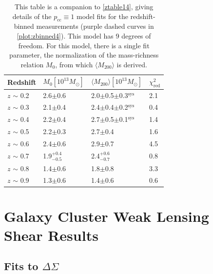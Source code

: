 \begin{landscape}
\begin{table}
\centering
    \caption[Shear Results for Redshift-Binned Clusters (Perfectly Centered Model)]{This table is a companion to \autoref{ztable14}, giving details of the $p_{\mathrm{cc}} \equiv 1$ model fits for the redshift-binned measurements (purple dashed curves in \autoref{plot:zbinned4}). This model has 9 degrees of freedom. For this model, there is a single fit parameter, the normalization of the mass-richness relation $M_0$, from which $\langle M_{200} \rangle$ is derived.}
    \begin{tabular}{llll}
      \hline
      Redshift & $M_0 \left[ 10^{13} M_{\odot}\right]$ & $\langle M_{200} \rangle \left[ 10^{13} M_{\odot}\right]$ & $\chi^2_{\mathrm{red}}$ \\ \hline
      $z$ $\sim$ 0.2 & 2.6$\pm$0.6 & 2.0$\pm$0.5$\pm$0.3$^{\mathrm{sys}}$ & 2.1  \\
      $z$ $\sim$ 0.3 & 2.1$\pm$0.4 & 2.4$\pm$0.4$\pm$0.2$^{\mathrm{sys}}$ & 0.4  \\
      $z$ $\sim$ 0.4 & 2.2$\pm$0.4 & 2.7$\pm$0.5$\pm$0.1$^{\mathrm{sys}}$ & 1.4  \\
      $z$ $\sim$ 0.5 & 2.2$\pm$0.3 & 2.7$\pm$0.4 & 1.6  \\
      $z$ $\sim$ 0.6 & 2.4$\pm$0.6 & 2.9$\pm$0.7 & 4.5  \\
      $z$ $\sim$ 0.7 & 1.9$^{+0.4}_{-0.5}$ & 2.4$^{+0.6}_{-0.7}$ & 0.8  \\
      $z$ $\sim$ 0.8 & 1.4$\pm$0.6 & 1.8$\pm$0.8 & 3.3  \\ 
      $z$ $\sim$ 0.9 & 1.3$\pm$0.6 & 1.4$\pm$0.6 & 0.6  \\
      \hline
    \end{tabular}
    \label{ztable24}
\end{table}

\end{landscape}


\section{Galaxy Cluster Weak Lensing Shear Results}
\label{sec:results4}


\subsection{Fits to $\Delta\Sigma$}
\label{sec:fits4}

